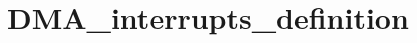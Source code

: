 \hypertarget{group___d_m_a__interrupts__definition}{\section{D\-M\-A\-\_\-interrupts\-\_\-definition}
\label{group___d_m_a__interrupts__definition}
}
